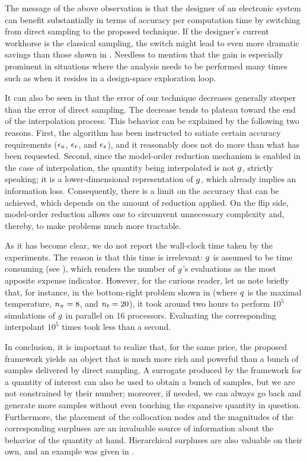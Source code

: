 The message of the above observation is that the designer of an electronic
system can benefit substantially in terms of accuracy per computation time by
switching from direct sampling to the proposed technique. If the designer's
current workhorse is the classical  sampling, the switch might lead to
even more dramatic savings than those shown in . Needless to
mention that the gain is especially prominent in situations where the analysis
needs to be performed many times such as when it resides in a design-space
exploration loop.

It can also be seen in  that the error of our technique decreases
generally steeper than the error of direct sampling. The decrease tends to
plateau toward the end of the interpolation process. This behavior can be
explained by the following two reasons. First, the algorithm has been instructed
to satiate certain accuracy requirements ($\epsilon_a$, $\epsilon_r$, and $\epsilon_s$),
and it reasonably does not do more than what has been requested. Second, since
the model-order reduction mechanism is enabled in the case of interpolation, the
quantity being interpolated is not $g$, strictly speaking; it is a
lower-dimensional representation of $g$, which already implies an information
loss. Consequently, there is a limit on the accuracy that can be achieved, which
depends on the amount of reduction applied. On the flip side, model-order
reduction allows one to circumvent unnecessary complexity and, thereby, to make
problems much more tractable.

As it has become clear, we do not report the wall-clock time taken by the
experiments. The reason is that this time is irrelevant: $g$ is assumed to be
time consuming (see ), which renders the number of $g$'s
evaluations as the most apposite expense indicator. However, for the curious
reader, let us note briefly that, for instance, in the bottom-right problem
shown in  (where $q$ is the maximal temperature, ${n_\pi} = 8$, and
${n_t} = 20$), it took around two hours to perform $10^5$ simulations of $g$ in
parallel on 16 processors. Evaluating the corresponding interpolant $10^5$ times
took less than a second.

In conclusion, it is important to realize that, for the same price, the proposed
framework yields an object that is much more rich and powerful than a bunch of
samples delivered by direct sampling. A surrogate produced by the framework for
a quantity of interest can also be used to obtain a bunch of samples, but we are
not constrained by their number; moreover, if needed, we can always go back and
generate more samples without even touching the expansive quantity in question.
Furthermore, the placement of the collocation nodes and the magnitudes of the
corresponding surpluses are an invaluable source of information about the
behavior of the quantity at hand. Hierarchical surpluses are also valuable on
their own, and an example was given in .
